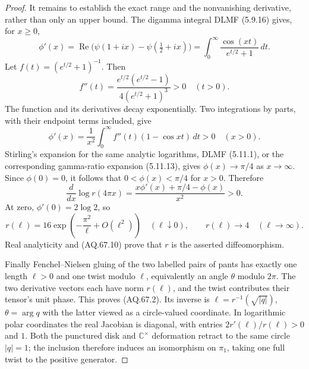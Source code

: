\begin{proof}
It remains to establish the exact range and the nonvanishing
derivative, rather than only an upper bound. The digamma integral
DLMF (5.9.16) gives, for $x\geq0$,
\[
 \phi'(x)=\operatorname{Re}\bigl(\psi(1+ix)
                            -\psi(\tfrac12+ix)\bigr)
           =\int_0^\infty\frac{\cos(xt)}{e^{t/2}+1}\,dt.
                                                               \tag{AQ.67.8}
\]
Let $f(t)=(e^{t/2}+1)^{-1}$. Then
\[
 f''(t)=\frac{e^{t/2}(e^{t/2}-1)}{4(e^{t/2}+1)^3}>0
               \quad(t>0).
\]
The function and its derivatives decay exponentially. Two
integrations by parts, with their endpoint terms included, give
\[
 \phi'(x)=\frac1{x^2}\int_0^\infty f''(t)(1-\cos xt)\,dt>0
                  \quad(x>0).                                \tag{AQ.67.9}
\]
Stirling's expansion for the same analytic logarithms, DLMF
(5.11.1), or the corresponding gamma-ratio expansion (5.11.13),
gives $\phi(x)\longrightarrow\pi/4$ as $x\to\infty$.
Since $\phi(0)=0$, it follows that
$0<\phi(x)<\pi/4$ for $x>0$. Therefore
\[
 \frac{d}{dx}\log r(4\pi x)
       =\frac{x\phi'(x)+\pi/4-\phi(x)}{x^2}>0.                 \tag{AQ.67.10}
\]
At zero, $\phi'(0)=2\log2$, so
\[
 r(\ell)=16\exp\left(-\frac{\pi^2}{\ell}+O(\ell^2)\right)
              \quad(\ell\downarrow0),
 \qquad r(\ell)\longrightarrow4\quad(\ell\to\infty).
\]
Real analyticity and (AQ.67.10) prove that $r$ is the asserted
diffeomorphism.

Finally Fenchel--Nielsen gluing of the two labelled pairs of
pants has exactly one length $\ell>0$ and one twist modulo
$\ell$, equivalently an angle $\theta$ modulo $2\pi$.
The two derivative vectors each have norm $r(\ell)$, and
the twist contributes their tensor's unit phase. This proves
(AQ.67.2). Its inverse is
$\ell=r^{-1}(\sqrt{|q|})$, $\theta=\arg q$ with the latter
viewed as a circle-valued coordinate. In logarithmic polar
coordinates the real Jacobian is diagonal, with entries
$2r'(\ell)/r(\ell)>0$ and $1$. Both the punctured disk and
$\mathbb C^\times$ deformation retract to the same circle
$|q|=1$; the inclusion therefore induces an isomorphism on
$\pi_1$, taking one full twist to the positive generator.
\end{proof}

